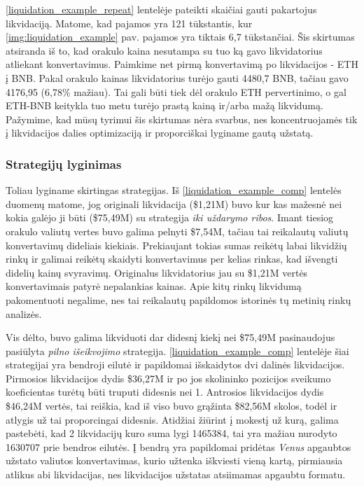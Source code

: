 \documentclass[]{VUMIFTemplateClass}
\begin{document}
\ref{liquidation_example_repeat} lentelėje pateikti skaičiai gauti pakartojus likvidaciją. Matome, kad pajamos yra 121 tūkstantis, kur \ref{img:liquidation_example} pav. pajamos yra tiktais 6,7 tūkstančiai. Šis skirtumas atsiranda iš to, kad orakulo kaina nesutampa su tuo ką gavo likvidatorius atliekant konvertavimus. Paimkime net pirmą konvertavimą po likvidacijos - ETH į BNB. Pakal orakulo kainas likvidatorius turėjo gauti 4480,7 BNB, tačiau gavo 4176,95 (6,78\% mažiau). Tai gali būti tiek dėl orakulo ETH pervertinimo, o gal ETH-BNB keitykla tuo metu turėjo prastą kainą ir/arba mažą likvidumą. Pažymime, kad mūsų tyrimui šis skirtumas nėra svarbus, nes koncentruojamės tik į likvidacijos dalies optimizaciją ir proporciškai lyginame gautą užstatą.

\subsubsection{Strategijų lyginimas}

Toliau lyginame skirtingas strategijas. Iš \ref{liquidation_example_comp} lentelės duomenų matome, jog originali likvidacija (\$1,21M) buvo kur kas mažesnė nei kokia galėjo ji būti (\$75,49M) su strategija \textit{iki uždarymo ribos}. Imant tiesiog orakulo valiutų vertes buvo galima pelnyti \$7,54M, tačiau tai reikalautų valiutų konvertavimų dideliais kiekiais. Prekiaujant tokias sumas reikėtų labai likvidžių rinkų ir galimai reikėtų skaidyti konvertavimus per kelias rinkas, kad išvengti didelių kainų svyravimų. Originalus likvidatorius jau su \$1,21M vertės konvertavimais patyrė nepalankias kainas. Apie kitų rinkų likvidumą pakomentuoti negalime, nes tai reikalautų papildomos istorinės tų metinių rinkų analizės.

Vis dėlto, buvo galima likviduoti dar didesnį kiekį nei \$75,49M pasinaudojus pasiūlyta \textit{pilno išeikvojimo} strategija. \ref{liquidation_example_comp} lentelėje šiai strategijai yra bendroji eilutė ir papildomai išskaidytos dvi dalinės likvidacijos. Pirmosios likvidacijos dydis \$36,27M ir po jos skolininko pozicijos sveikumo koeficientas turėtų būti truputi didesnis nei 1. Antrosios likvidacijos dydis \$46,24M vertės, tai reiškia, kad iš viso buvo grąžinta \$82,56M skolos, todėl ir atlygis už tai proporcingai didesnis. Atidžiai žiūrint į mokestį už kurą, galima pastebėti, kad 2 likvidacijų kuro suma lygi 1465384, tai yra mažiau nurodyto 1630707 prie bendros eilutės. Į bendrą yra papildomai pridėtas \textit{Venus} apgaubtos užstato valiutos konvertavimas, kurio užtenka iškviesti vieną kartą, pirmiausia atlikus abi likvidacijas, nes likvidacijos užstatas atsiimamas apgaubtu formatu.
\end{document}
